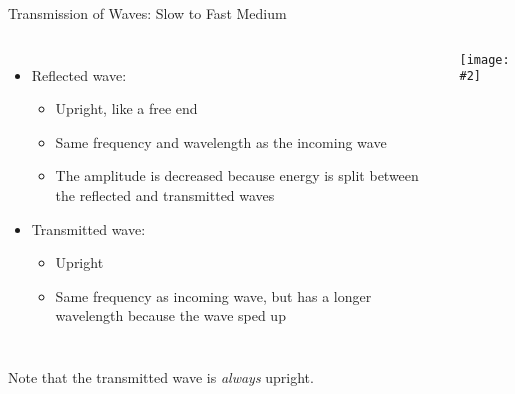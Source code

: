 \documentclass[12pt,aspectratio=169]{beamer}
\newcommand{\pic}[2]{\texttt{[image: \#2]}}
\begin{document}
\begin{frame}{Transmission of Waves: Slow to Fast Medium}
  \begin{columns}
    \begin{itemize}
    \item Reflected wave:
      \begin{itemize}
      \item Upright, like a free end
      \item Same frequency and wavelength as the incoming wave
      \item The amplitude is decreased because energy is split between the
        reflected and transmitted waves
      \end{itemize}
    \item Transmitted wave:
      \begin{itemize}
      \item Upright
      \item Same frequency as incoming wave, but has a longer wavelength because
        the wave sped up
      \end{itemize}
    \end{itemize}
    
    \pic{1}{24.png}
  \end{columns}
  Note that the transmitted wave is \emph{always} upright.
\end{frame}
%
%
%
\end{document}
